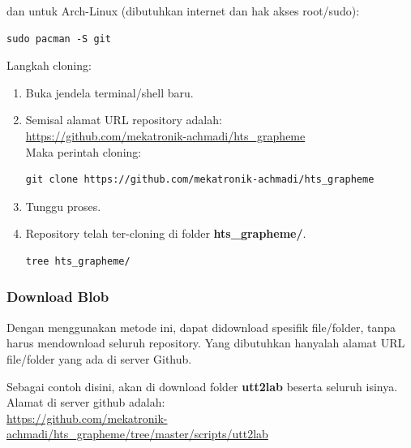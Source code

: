 \documentclass[12pt,]{article}
\begin{document}
	dan untuk Arch-Linux (dibutuhkan internet dan hak akses root/sudo):
	\begin{verbatim}
sudo pacman -S git
	\end{verbatim}
	
	Langkah cloning:
	\begin{enumerate}
		\item Buka jendela terminal/shell baru.
		
		\item Semisal alamat URL repository adalah:\\
		\url{https://github.com/mekatronik-achmadi/hts_grapheme} \\
		Maka perintah cloning:
		\begin{verbatim}
git clone https://github.com/mekatronik-achmadi/hts_grapheme
		\end{verbatim}
		
		\item Tunggu proses.
		
		\item Repository telah ter-cloning di folder \textbf{hts\_grapheme/}.
		\begin{verbatim}
tree hts_grapheme/
		\end{verbatim}
		
	\end{enumerate}
	
	\newpage
	\subsubsection{Download Blob}
	
	Dengan menggunakan metode ini, dapat didownload spesifik file/folder,
	tanpa harus mendownload seluruh repository.
	Yang dibutuhkan hanyalah alamat URL file/folder yang ada di server Github.
	
	Sebagai contoh disini, akan di download folder \textbf{utt2lab} beserta seluruh isinya.
	Alamat di server github adalah:\\
	\url{https://github.com/mekatronik-achmadi/hts_grapheme/tree/master/scripts/utt2lab}
	
\end{document}
